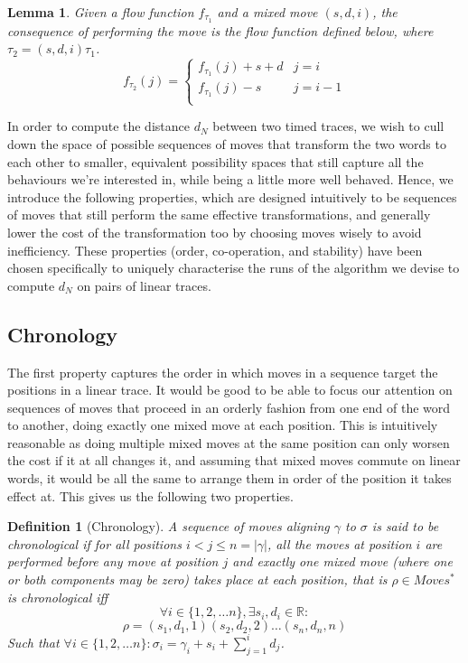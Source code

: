 \documentclass[conference]{IEEEtran}
\newcounter{cases}
\newtheorem{lemma}[theorem]{Lemma}
\newtheorem{definition}{Definition}
\begin{document}
	\begin{lemma}\label{FlowFuncTrans}
		Given a flow function $f_{\tau_1}$ and a mixed move $(s, d, i)$, the consequence of performing the move is the flow function defined below, where $\tau_2 = (s, d, i)\tau_1$. 
		$$f_{\tau_2}(j) = \begin{cases} 
			f_{\tau_1}(j) + s + d & j = i\\
			f_{\tau_1}(j) - s  & j = i-1\\
		\end{cases}
		$$
		
	\end{lemma}
	
	
	In order to compute the distance $d_N$ between two timed traces, we wish to cull down the space of possible sequences of moves that transform the two words to each other to smaller, equivalent possibility spaces that still capture all the behaviours we're interested in, while being a little more well behaved. 
	Hence, we introduce the following properties, which are designed intuitively to be sequences of moves that still perform the same effective transformations, and generally lower the cost of the transformation too by choosing moves wisely to avoid inefficiency. 
	These properties (order, co-operation, and stability) have been chosen specifically to uniquely characterise the runs of the algorithm we devise to compute $d_N$ on pairs of linear traces. 
	
	\subsection{Chronology}
	The first property captures the order in which moves in a sequence target the positions in a linear trace. 
	It would be good to be able to focus our attention on sequences of moves that proceed in an orderly fashion from one end of the word to another, doing exactly one mixed move at each position. This is intuitively reasonable as doing multiple mixed moves at the same position can only worsen the cost if it at all changes it, and assuming that mixed moves commute on linear words, it would be all the same to arrange them in order of the position it takes effect at. This gives us the following two properties. 
	
	\begin{definition}[Chronology]
		A sequence of moves aligning $\gamma$ to $\sigma$ is said to be \textit{chronological} if for all positions $i < j \leq n = |\gamma|$, all the moves at position $i$ are performed before any move at position $j$ and exactly one mixed move (where one or both components may be zero) takes place at each position, that is $\rho \in Moves^*$ is chronological iff  $$\forall i \in \{1, 2, \dots n\},  \exists s_i, d_i \in \mathbb{R} :$$$$ \rho = (s_1, d_1, 1)(s_2, d_2, 2)\dots (s_n, d_n, n) $$
		Such that $\forall i \in \{1, 2, \dots n\} : \sigma_i = \gamma_i + s_i + \sum_{j=1}^{i} d_j$. 
		
	\end{definition}
	
\end{document}
